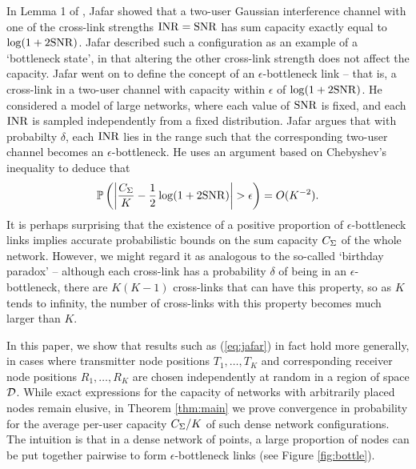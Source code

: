 \documentclass[journal]{IEEEtran}
\begin{document}
In Lemma 1 of \cite{jafar}, Jafar showed that a two-user Gaussian interference channel with one
of the cross-link strengths ${\rm{INR}} = {\rm{SNR}}$ has sum capacity exactly equal to
$\log(1+2{\rm{SNR}})$. 
Jafar described such a configuration as an example of 
a `bottleneck state', in that altering the other cross-link
strength does not affect the capacity. Jafar went on to
define the
concept of an $\epsilon$-bottleneck link -- that is, a cross-link in a two-user
channel with capacity within
$\epsilon$ of $\log(1+ 2 {\rm{SNR}})$.
He considered a model of  large networks,
where each value of ${\rm{SNR}}$ is fixed, and each ${\rm{INR}}$ is sampled independently from
a fixed distribution. Jafar argues that with probabilty $\delta$, each ${\rm{INR}}$ lies
in the range such that the corresponding two-user channel becomes an 
$\epsilon$-bottleneck. 
 He uses an argument based on Chebyshev's inequality to deduce 
that  
\begin{equation} \label{eq:jafar}
{\mathbb {P}} \left( \left| \frac{C_{\Sigma}}{K} - \frac{1}{2} \log(1+2 {\rm{SNR}}) \right| > \epsilon
\right) = O(K^{-2}).\end{equation} 
It is perhaps surprising that
the existence of a positive proportion
of $\epsilon$-bottleneck links implies accurate probabilistic bounds
on the sum capacity $C_{\Sigma}$ of the whole network. However, we might regard it as
analogous to the so-called `birthday paradox' -- although each cross-link has a probability
$\delta$ of being in an $\epsilon$-bottleneck, there are $K(K-1)$ cross-links that 
can have this property, so as $K$ tends to infinity, the number of cross-links with
this property becomes much larger than $K$.

In this paper, we show that results such as (\ref{eq:jafar}) in fact hold more
generally, in cases where transmitter node positions $T_1, \ldots, T_K$ and
corresponding receiver node positions $R_1, \ldots, R_K$ are chosen independently 
at random in a region of space ${\mathcal{D}}$. 
While exact expressions for the capacity
of networks with arbitrarily placed nodes remain elusive, in Theorem
\ref{thm:main} we prove convergence
in probability for the average per-user capacity $C_{\Sigma}/K$ 
of such dense network configurations.  
The intuition is that in a dense network
of points, a large proportion of nodes can be put together pairwise to
form $\epsilon$-bottleneck links (see Figure \ref{fig:bottle}). 
\end{document}
